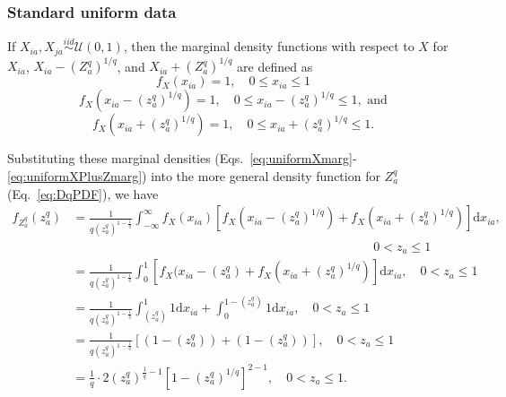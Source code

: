 \documentclass[10pt,letterpaper]{article}
\begin{document}
\subsubsection{Standard uniform data}

If $X_{ia},X_{ja} \overset{iid}{\sim} \mathcal{U}(0,1)$, then the marginal density functions with respect to $X$ for $X_{ia}$, $X_{ia} - \left(Z^q_a\right)^{1/q}$, and $X_{ia} + \left(Z^q_a\right)^{1/q}$ are defined as
%
\begin{equation}\label{eq:uniformXmarg}
f_X(x_{ia}) = 1, \quad 0 \leq x_{ia} \leq 1
\end{equation}
%
\begin{equation}\label{eq:uniformXMinusZmarg}
f_X\left(x_{ia} - \left(z^q_a\right)^{1/q}\right) = 1, \quad 0 \leq x_{ia} - \left(z^q_a\right)^{1/q} \leq 1, \text{ and}
\end{equation}
%
\begin{equation}\label{eq:uniformXPlusZmarg}
f_X\left(x_{ia} + \left(z^q_a\right)^{1/q}\right) = 1, \quad 0 \leq x_{ia} + \left(z^q_a\right)^{1/q} \leq 1.
\end{equation}

Substituting these marginal densities (Eqs.~\ref{eq:uniformXmarg}-\ref{eq:uniformXPlusZmarg}) into the more general density function for $Z^q_a$ (Eq.~\ref{eq:DqPDF}), we have
%
\begin{equation}\label{eq:uniformDqPDF}
\begin{aligned}
f_{Z^q_a}(z^q_a) &= \frac{1}{q\left(z^q_a\right)^{1 - \frac{1}{q}}}\int_{-\infty}^{\infty}f_X(x_{ia})\left[f_X\left(x_{ia} - \left(z^q_a\right)^{1/q}\right) + f_X\left(x_{ia} + \left(z^q_a\right)^{1/q}\right)\right]\text{d}x_{ia},\\
& \hspace{4in} 0 < z_a \leq 1\\
&= \frac{1}{q\left(z^q_a\right)^{1 - \frac{1}{q}}}\int_{0}^{1}\left[f_X(x_{ia} - \left(z^q_a\right) + f_X\left(x_{ia} + \left(z^q_a\right)^{1/q}\right)\right]\text{d}x_{ia}, \quad 0 < z_a \leq 1 \\
&= \frac{1}{q\left(z^q_a\right)^{1 - \frac{1}{q}}}\int_{\left(z^q_a\right)}^{1}1\text{d}x_{ia} + \int_{0}^{1 - \left(z^q_a\right)}1\text{d}x_{ia}, \quad 0 < z_a \leq 1 \\
&= \frac{1}{q\left(z^q_a\right)^{1 - \frac{1}{q}}}\left[\left(1 - \left(z^q_a\right)\right) + \left(1 - \left(z^q_a\right)\right)\right], \quad 0 < z_a \leq 1 \\
&= \frac{1}{q} \cdot 2 \left(z^q_a\right)^{\frac{1}{q} - 1}\left[1 - \left(z^q_a\right)^{1/q}\right]^{2 - 1}, \quad 0 < z_a \leq 1.
\end{aligned}
\end{equation}
\end{document}
